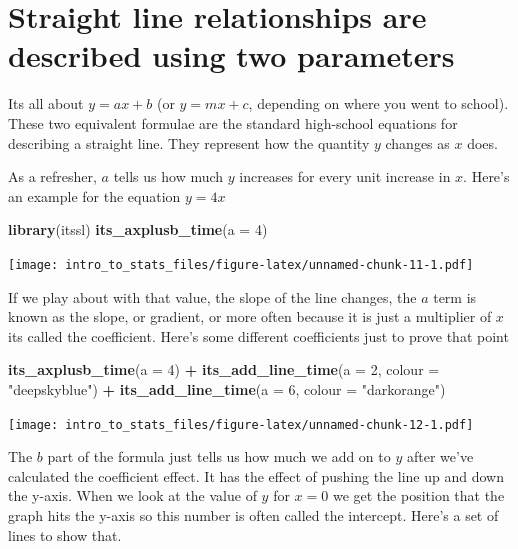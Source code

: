 \documentclass[
]{book}
\newenvironment{Shaded}{\begin{snugshade}}{\end{snugshade}}
\newcommand{\DataTypeTok}[1]{\textcolor[rgb]{0.13,0.29,0.53}{#1}}
\newcommand{\DecValTok}[1]{\textcolor[rgb]{0.00,0.00,0.81}{#1}}
\newcommand{\KeywordTok}[1]{\textcolor[rgb]{0.13,0.29,0.53}{\textbf{#1}}}
\newcommand{\NormalTok}[1]{#1}
\newcommand{\OperatorTok}[1]{\textcolor[rgb]{0.81,0.36,0.00}{\textbf{#1}}}
\newcommand{\StringTok}[1]{\textcolor[rgb]{0.31,0.60,0.02}{#1}}
\begin{document}
\hypertarget{straight-line-relationships-are-described-using-two-parameters}{%
\section{Straight line relationships are described using two parameters}\label{straight-line-relationships-are-described-using-two-parameters}}

Its all about \(y = ax + b\) (or \(y = mx + c\), depending on where you went to school). These two equivalent formulae are the standard high-school equations for describing a straight line. They represent how the quantity \(y\) changes as \(x\) does.

As a refresher, \(a\) tells us how much \(y\) increases for every unit increase in \(x\). Here's an example for the equation \(y = 4x\)

\begin{Shaded}
\begin{Highlighting}[]
\KeywordTok{library}\NormalTok{(itssl)}
\KeywordTok{its_axplusb_time}\NormalTok{(}\DataTypeTok{a =} \DecValTok{4}\NormalTok{)}
\end{Highlighting}
\end{Shaded}

\texttt{[image: intro\_to\_stats\_files/figure-latex/unnamed-chunk-11-1.pdf]}

If we play about with that value, the slope of the line changes, the \(a\) term is known as the slope, or gradient, or more often because it is just a multiplier of \(x\) its called the coefficient. Here's some different coefficients just to prove that point

\begin{Shaded}
\begin{Highlighting}[]
\KeywordTok{its_axplusb_time}\NormalTok{(}\DataTypeTok{a =} \DecValTok{4}\NormalTok{) }\OperatorTok{+}
\StringTok{  }\KeywordTok{its_add_line_time}\NormalTok{(}\DataTypeTok{a =} \DecValTok{2}\NormalTok{, }\DataTypeTok{colour =} \StringTok{"deepskyblue"}\NormalTok{) }\OperatorTok{+}
\StringTok{  }\KeywordTok{its_add_line_time}\NormalTok{(}\DataTypeTok{a =} \DecValTok{6}\NormalTok{, }\DataTypeTok{colour =} \StringTok{"darkorange"}\NormalTok{)}
\end{Highlighting}
\end{Shaded}

\texttt{[image: intro\_to\_stats\_files/figure-latex/unnamed-chunk-12-1.pdf]}

The \(b\) part of the formula just tells us how much we add on to \(y\) after we've calculated the coefficient effect. It has the effect of pushing the line up and down the y-axis. When we look at the value of \(y\) for \(x = 0\) we get the position that the graph hits the y-axis so this number is often called the intercept. Here's a set of lines to show that.
\end{document}
